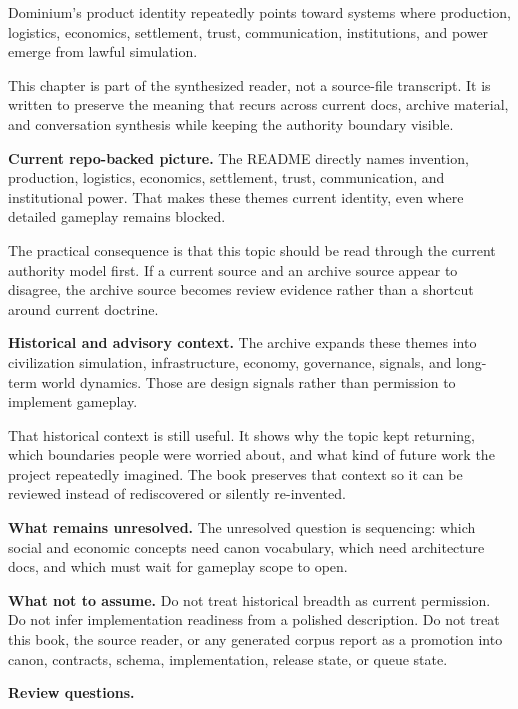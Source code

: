 \documentclass[10.5pt,a4paper,openany]{book}
\begin{document}
Dominium's product identity repeatedly points toward systems where production, logistics, economics, settlement, trust, communication, institutions, and power emerge from lawful simulation.\allowbreak{}


This chapter is part of the synthesized reader, not a source-\allowbreak{}file transcript.\allowbreak{} It is written to preserve the meaning that recurs across current docs, archive material, and conversation synthesis while keeping the authority boundary visible.\allowbreak{}


\textbf{Current repo-backed picture.} The README directly names invention, production, logistics, economics, settlement, trust, communication, and institutional power.\allowbreak{} That makes these themes current identity, even where detailed gameplay remains blocked.\allowbreak{}


The practical consequence is that this topic should be read through the current authority model first.\allowbreak{} If a current source and an archive source appear to disagree, the archive source becomes review evidence rather than a shortcut around current doctrine.\allowbreak{}


\textbf{Historical and advisory context.} The archive expands these themes into civilization simulation, infrastructure, economy, governance, signals, and long-\allowbreak{}term world dynamics.\allowbreak{} Those are design signals rather than permission to implement gameplay.\allowbreak{}


That historical context is still useful.\allowbreak{} It shows why the topic kept returning, which boundaries people were worried about, and what kind of future work the project repeatedly imagined.\allowbreak{} The book preserves that context so it can be reviewed instead of rediscovered or silently re-\allowbreak{}invented.\allowbreak{}


\textbf{What remains unresolved.} The unresolved question is sequencing: which social and economic concepts need canon vocabulary, which need architecture docs, and which must wait for gameplay scope to open.\allowbreak{}


\textbf{What not to assume.} Do not treat historical breadth as current permission.\allowbreak{} Do not infer implementation readiness from a polished description.\allowbreak{} Do not treat this book, the source reader, or any generated corpus report as a promotion into canon, contracts, schema, implementation, release state, or queue state.\allowbreak{}


\textbf{Review questions.}
\end{document}
